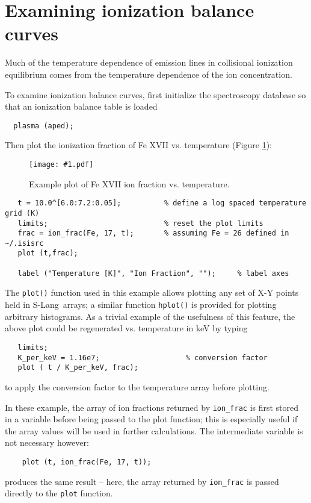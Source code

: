 \documentclass{book}
\newcommand{\putfig}[1]{\texttt{[image: \#1.pdf]}}
\newcommand{\putfig}[1]{\psfig{file=#1.ps}}
\newcommand{\slang}{{\sc S-Lang}}
\begin{document}
{\section{Examining ionization balance curves}

Much of the temperature dependence of emission lines in collisional
ionization equilibrium comes from the temperature dependence of the
ion concentration.

To examine ionization balance curves, first initialize the spectroscopy database
so that an ionization balance table is loaded
 \begin{verbatim}
  plasma (aped);
 \end{verbatim}
Then plot the ionization fraction of Fe XVII vs. temperature (Figure
\ref{fig:ion_frac}):

\begin{figure}[ht]
\putfig{figures/ion_frac}
\caption{Example plot of Fe XVII ion fraction vs. temperature.}
\label{fig:ion_frac}
\end{figure}

\begin{verbatim}
   t = 10.0^[6.0:7.2:0.05];          % define a log spaced temperature grid (K)
   limits;                           % reset the plot limits
   frac = ion_frac(Fe, 17, t);       % assuming Fe = 26 defined in ~/.isisrc
   plot (t,frac);

   label ("Temperature [K]", "Ion Fraction", "");     % label axes
\end{verbatim}

The {\tt plot()} function used in this example allows plotting any set of
X-Y points held in \slang\ arrays; a similar function {\tt hplot()} is
provided for plotting arbitrary histograms.  As a trivial example of the
usefulness of this feature, the above plot could be regenerated vs.
temperature in keV by typing
\begin{verbatim}
   limits;
   K_per_keV = 1.16e7;                    % conversion factor
   plot ( t / K_per_keV, frac);
\end{verbatim}
to apply the conversion factor to the temperature array before plotting.

In these example, the array of ion fractions returned by {\tt ion\_frac} is
first stored in a variable before being passed to the plot function;  this
is especially useful if the array values will be used in further calculations.
The intermediate variable is not necessary however:
\begin{verbatim}
    plot (t, ion_frac(Fe, 17, t));
\end{verbatim}
produces the same result -- here, the array returned by {\tt ion\_frac} is
passed directly to the {\tt plot} function.

}
\end{document}
